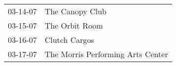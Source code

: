 \begin{supertabular}{p{0.07\textwidth}p{0.23\textwidth}}
 03-14-07 &                    The Canopy Club \\
 03-15-07 &                     The Orbit Room \\
 03-16-07 &                      Clutch Cargos \\
 03-17-07 &  The Morris Performing Arts Center \\
\end{supertabular}
